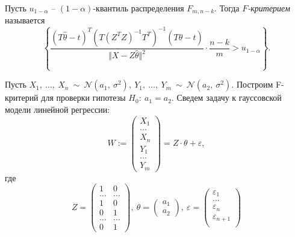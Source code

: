 \begin{definition}
    Пусть $\displaystyle u_{1-\alpha }$ -- $\displaystyle ( 1-\alpha )$-квантиль распределения $\displaystyle F_{m,n-k}$. Тогда $\displaystyle F$\textit{-критерием} называется
    \begin{equation*}
        \left\{\dfrac{( T\hat{\theta } -t)^{T}\left( T\left( Z^{T} Z\right)^{-1} T^{T}\right)^{-1}( T\hat{\theta } -t)}{\Vert X-Z\hat{\theta }\Vert ^{2}} \cdotp \dfrac{n-k}{m}  >u_{1-\alpha }\right\} .
    \end{equation*}
\end{definition}

\begin{example}
    Пусть $\displaystyle X_{1} ,\ \dotsc ,\ X_{n} \ \sim \ \mathcal{N}\left( a_{1} ,\ \sigma ^{2}\right) ,\ Y_{1} ,\ \dotsc ,\ Y_{m} \ \sim \ \mathcal{N}\left( a_{2} ,\ \sigma ^{2}\right)$. Построим F-критерий для проверки гипотезы $\displaystyle H_{0} :\ a_{1} =a_{2}$. Сведем задачу к гауссовской модели линейной регрессии:
    \begin{equation*}
        W:=\begin{pmatrix}
        X_{1}\\
        \dotsc \\
        X_{n}\\
        Y_{1}\\
        \dotsc \\
        Y_{m}
        \end{pmatrix} =Z\cdotp \theta +\varepsilon ,
    \end{equation*}
    где
    \begin{equation*}
        Z=\begin{pmatrix}
        1 & 0\\
        \dotsc  & \dotsc \\
        1 & 0\\
        0 & 1\\
        \dotsc  & \dotsc \\
        0 & 1
        \end{pmatrix} ,\ \theta =\begin{pmatrix}
        a_{1}\\
        a_{2}
        \end{pmatrix} ,\ \varepsilon =\begin{pmatrix}
        \varepsilon _{1}\\
        \dotsc \\
        \varepsilon _{n}\\
        \varepsilon _{n+1}\\

\end{pmatrix}
\end{equation*}
\end{example}
